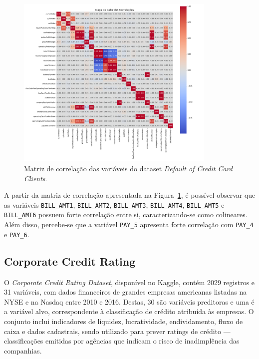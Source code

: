\begin{figure}[H]
    \centering
    \includegraphics[width=0.85\textwidth]{figs/matriz_correlacao_inadimplencia.png}
    \caption{Matriz de correlação das variáveis do dataset \textit{Default of Credit Card Clients}.}
    \label{fig:matriz_correlacao_inadimplencia}
\end{figure}

A partir da matriz de correlação apresentada na Figura~\ref{fig:matriz_correlacao_inadimplencia}, é possível observar que as variáveis \texttt{BILL\_AMT1}, \texttt{BILL\_AMT2}, \texttt{BILL\_AMT3}, \texttt{BILL\_AMT4}, \texttt{BILL\_AMT5} e \texttt{BILL\_AMT6} possuem forte correlação entre si, caracterizando-se como colineares. Além disso, percebe-se que a variável \texttt{PAY\_5} apresenta forte correlação com \texttt{PAY\_4} e \texttt{PAY\_6}.

\subsection{Corporate Credit Rating}

O \textit{Corporate Credit Rating Dataset}, disponível no Kaggle, contém 2029 registros e 31 variáveis, com dados financeiros de grandes empresas americanas listadas na NYSE e na Nasdaq entre 2010 e 2016. Destas, 30 são variáveis preditoras e uma é a variável alvo, correspondente à classificação de crédito atribuída às empresas. O conjunto inclui indicadores de liquidez, lucratividade, endividamento, fluxo de caixa e dados cadastrais, sendo utilizado para prever ratings de crédito — classificações emitidas por agências que indicam o risco de inadimplência das companhias.

